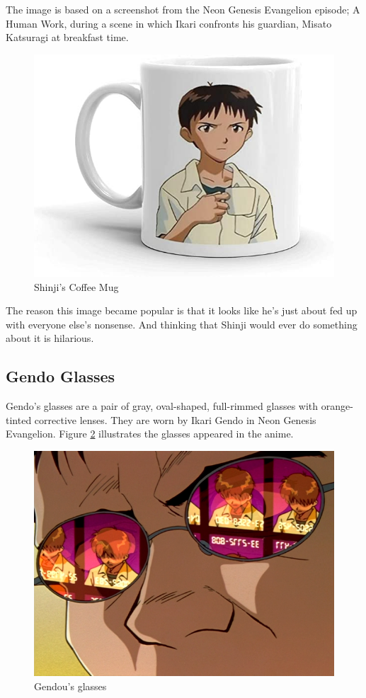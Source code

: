 \documentclass[runningheads]{llncs}
\begin{document}
        The image is based on a screenshot from the Neon Genesis Evangelion episode; A Human Work, during a scene in which Ikari confronts his guardian, Misato Katsuragi at breakfast time.
        
        \begin{figure}[!htb]
            \centering
            \includegraphics[width=.5\textwidth]{assets/51l7cbwfvNL._AC_SY450_.jpg}
            \caption{Shinji's Coffee Mug \protect\footnotemark}
            \label{fig:shinji-mug}
        \end{figure}
        
        
        The reason this image became popular is that it looks like he's just about fed up with everyone else's nonsense. And thinking that Shinji would ever do something about it is hilarious.
        
    \subsection{Gendo Glasses}
    Gendo's glasses \cite{glasses} are a pair of gray, oval-shaped, full-rimmed glasses with orange-tinted corrective lenses. They are worn by Ikari Gendo in Neon Genesis Evangelion. Figure \ref{fig:glasses} illustrates the glasses appeared in the anime.
    
    \begin{figure}[!htb]
        \centering
        \includegraphics[width=.5\textwidth]{assets/Gendo1.png}
        \caption{Gendou's glasses \protect\footnotemark}
        \label{fig:glasses}
    \end{figure}
    
\end{document}
